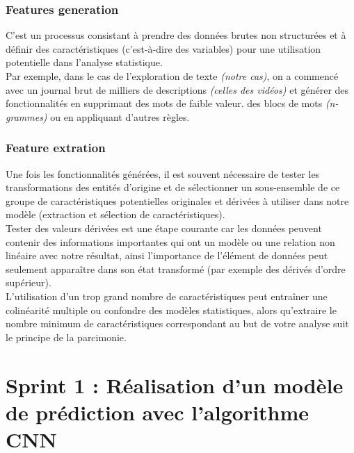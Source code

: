 \subsection{Features generation}
C'est un processus consistant à prendre des données brutes non structurées et à définir des caractéristiques (c'est-à-dire des variables) pour une utilisation potentielle dans l'analyse statistique.\\
 Par exemple, dans le cas de l'exploration de texte \textit{(notre cas)}, on a  commencé avec un journal brut de milliers de descriptions \textit{(celles des vidéos)} et générer des fonctionnalités en supprimant des mots de faible valeur. des blocs de mots \textit{(n-grammes)} ou en appliquant d'autres règles.
\subsection{Feature extration}
Une fois les fonctionnalités générées, il est souvent nécessaire de tester les transformations des entités d'origine et de sélectionner un sous-ensemble de ce groupe de caractéristiques potentielles originales et dérivées à utiliser dans notre modèle (extraction et sélection de caractéristiques).\\[0.2cm]
Tester des valeurs dérivées est une étape courante car les données peuvent contenir des informations importantes qui ont un modèle ou une relation non linéaire avec notre résultat, ainsi l'importance de l'élément de données peut seulement apparaître dans son état transformé (par exemple des dérivés d'ordre supérieur).\\[0.2cm]
 L'utilisation d'un trop grand nombre de caractéristiques peut entraîner une colinéarité multiple ou confondre des modèles statistiques, alors qu'extraire le nombre minimum de caractéristiques correspondant au but de votre analyse suit le principe de la parcimonie.

\chapter{Sprint 1 : Réalisation d’un modèle de prédiction avec l’algorithme CNN}
\label{Chapitre 4} %


